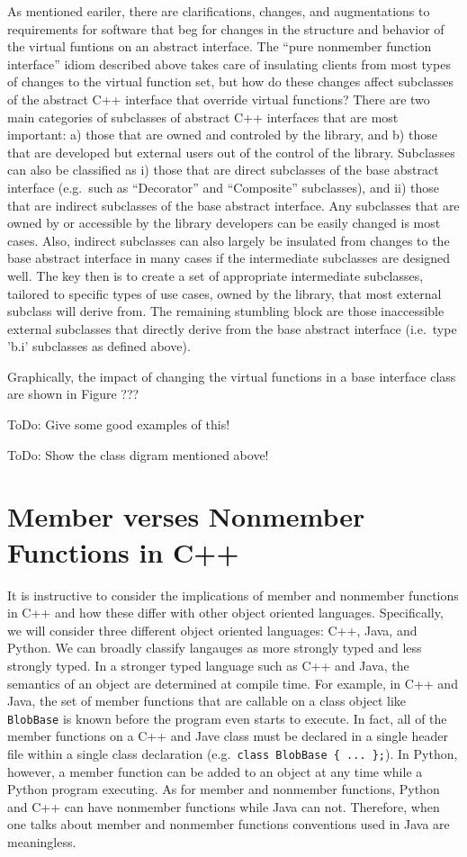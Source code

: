 \documentclass[pdf,ps2pdf,11pt]{SANDreport}
\begin{document}
As mentioned eariler, there are clarifications, changes, and augmentations to
requirements for software that beg for changes in the structure and behavior
of the virtual funtions on an abstract interface.  The ``pure nonmember
function interface'' idiom described above takes care of insulating clients
from most types of changes to the virtual function set, but how do these
changes affect subclasses of the abstract C++ interface that override virtual
functions?  There are two main categories of subclasses of abstract C++
interfaces that are most important: a) those that are owned and controled by
the library, and b) those that are developed but external users out of the
control of the library.  Subclasses can also be classified as i) those that
are direct subclasses of the base abstract interface (e.g.\ such as
``Decorator'' and ``Composite'' subclasses), and ii) those that are indirect
subclasses of the base abstract interface.  Any subclasses that are owned by
or accessible by the library developers can be easily changed is most cases.
Also, indirect subclasses can also largely be insulated from changes to the
base abstract interface in many cases if the intermediate subclasses are
designed well.  The key then is to create a set of appropriate intermediate
subclasses, tailored to specific types of use cases, owned by the library,
that most external subclass will derive from.  The remaining stumbling block
are those inaccessible external subclasses that directly derive from the base
abstract interface (i.e.\ type 'b.i' subclasses as defined above).

Graphically, the impact of changing the virtual functions in a base interface
class are shown in Figure ???

ToDo: Give some good examples of this!

ToDo: Show the class digram mentioned above!

%
\section{Member verses Nonmember Functions in C++}
%

It is instructive to consider the implications of member and nonmember
functions in C++ and how these differ with other object oriented languages.
Specifically, we will consider three different object oriented languages: C++,
Java, and Python.  We can broadly classify langauges as more strongly typed
and less strongly typed.  In a stronger typed language such as C++ and Java,
the semantics of an object are determined at compile time.  For example, in
C++ and Java, the set of member functions that are callable on a class object
like {}\texttt{BlobBase} is known before the program even starts to execute.
In fact, all of the member functions on a C++ and Jave class must be declared
in a single header file within a single class declaration (e.g.\
{}\texttt{class BlobBase \{ ... \};}).  In Python, however, a member function
can be added to an object at any time while a Python program executing.  As
for member and nonmember functions, Python and C++ can have nonmember
functions while Java can not.  Therefore, when one talks about member and
nonmember functions conventions used in Java are meaningless.
\end{document}
